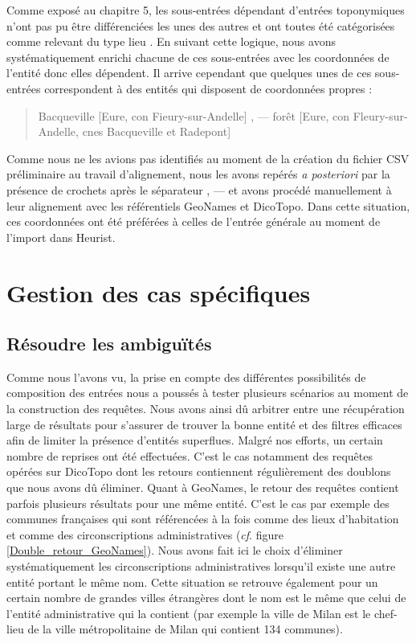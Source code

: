 \documentclass[a4paper,12pt,twoside]{book}
\begin{document}
	Comme exposé au chapitre 5, les sous-entrées dépendant d'entrées toponymiques n'ont pas pu être différenciées les unes des autres et ont toutes été catégorisées comme relevant du type \og lieu \fg{}. En suivant cette logique, nous avons systématiquement enrichi chacune de ces sous-entrées avec les coordonnées de l'entité donc elles dépendent. Il arrive cependant que quelques unes de ces sous-entrées correspondent à des entités qui disposent de coordonnées propres :
	
	\begin{quotation}
		Bacqueville [Eure, con Fieury-sur-Andelle] , — forêt [Eure, con
		Fleury-sur-Andelle, cnes Bacqueville et Radepont]
	\end{quotation}
	
	Comme nous ne les avions pas identifiés au moment de la création du fichier CSV préliminaire au travail d'alignement, nous les avons repérés \textit{a posteriori} par la présence de crochets après le séparateur \og , — \fg{} et avons procédé manuellement à leur alignement avec les référentiels GeoNames et DicoTopo. Dans cette situation, ces coordonnées ont été préférées à celles de l'entrée générale au moment de l'import dans Heurist.
	
	\section{Gestion des cas spécifiques}
	
	\subsection{Résoudre les ambiguïtés}
	
	Comme nous l'avons vu, la prise en compte des différentes possibilités de composition des entrées nous a poussés à tester plusieurs scénarios au moment de la construction des requêtes. Nous avons ainsi dû arbitrer entre une récupération large de résultats pour s'assurer de trouver la bonne entité et des filtres efficaces afin de limiter la présence d'entités superflues. Malgré nos efforts, un certain nombre de reprises ont été effectuées. C'est le cas notamment des requêtes opérées sur DicoTopo dont les retours contiennent régulièrement des doublons que nous avons dû éliminer. Quant à GeoNames, le retour des requêtes contient parfois plusieurs résultats pour une même entité. C'est le cas par exemple des communes françaises qui sont référencées à la fois comme des lieux d'habitation et comme des circonscriptions administratives (\textit{cf}. figure \ref{Double_retour_GeoNames}). Nous avons fait ici le choix d'éliminer systématiquement les circonscriptions administratives lorsqu'il existe une autre entité portant le même nom. Cette situation se retrouve également pour un certain nombre de grandes villes étrangères dont le nom est le même que celui de l'entité administrative qui la contient (par exemple la ville de Milan est le chef-lieu de la ville métropolitaine de Milan qui contient 134 communes).
	
\end{document}
